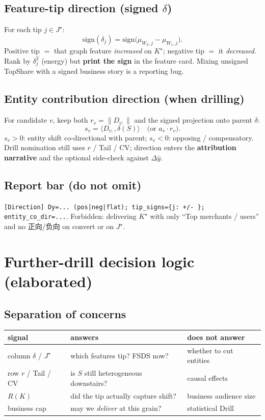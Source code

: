 \documentclass[11pt]{article}
\begin{document}
\subsection{Feature-tip direction (signed $\delta$)}
For each tip $j\in J^\star$:
\[
  \mathrm{sign}(\delta_j)
  =\mathrm{sign}\!\big(\mu_{W_2,j}-\mu_{W_1,j}\big).
\]
Positive tip $=$ that graph feature \emph{increased} on $K^\star$;
negative tip $=$ it \emph{decreased}.
Rank by $\delta_j^2$ (energy) but \textbf{print the sign} in the
feature card. Mixing unsigned TopShare with a signed business
story is a reporting bug.

\subsection{Entity contribution direction (when drilling)}
For candidate $v$, keep both $r_v=\|D_{v:}\|$ and the
signed projection onto parent $\delta$:
\[
  s_v
  =\langle D_{v:},\delta(S)\rangle
  \quad\text{(or }a_v\cdot r_v\text{)}.
\]
$s_v>0$: entity shift co-directional with parent;
$s_v<0$: opposing / compensatory.
Drill nomination still uses $r$ / Tail / CV;
direction enters the \textbf{attribution narrative} and the
optional side-check against $\Delta\bar y$.

\subsection{Report bar (do not omit)}
\texttt{[Direction] Dy=... (pos|neg|flat); tip\_signs=\{j: +/- \};}
\texttt{entity\_co\_dir=...}.
Forbidden: delivering $K^\star$ with only ``Top merchants / users''
and no 正向/负向 on convert or on $J^\star$.

\section{Further-drill decision logic (elaborated)}
\label{sec:drill}

\subsection{Separation of concerns}
\begin{center}
\begin{tabular}{lll}
\toprule
signal & answers & does \textbf{not} answer \\
\midrule
column $\delta$ / $J^\star$ & which features tip? FSDS now? & whether to cut entities \\
row $r$ / Tail / CV & is $S$ still heterogeneous downstairs? & causal effects \\
$R(K)$ & did the tip actually capture shift? & business audience size \\
business cap & may we \emph{deliver} at this grain? & statistical Drill \\
\bottomrule
\end{tabular}
\end{center}
\end{document}

